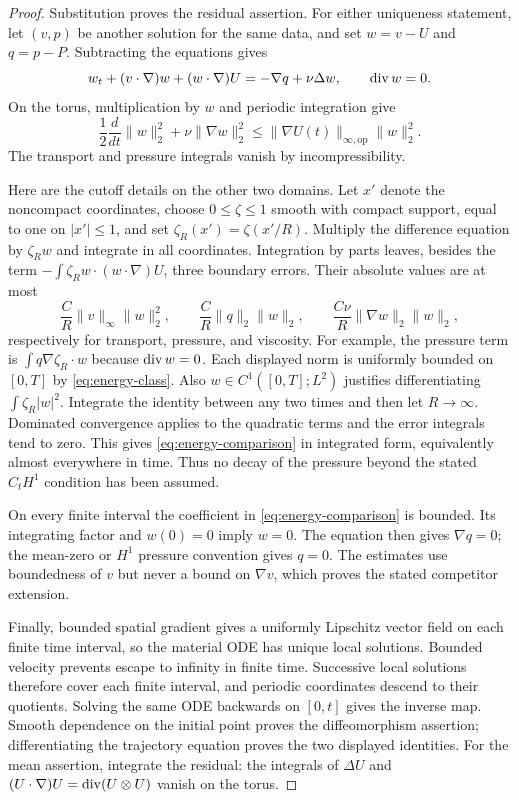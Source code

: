 \begin{proof}
Substitution proves the residual assertion. For either uniqueness
statement, let $(v,p)$ be another solution for the same data, and set
$w=v-U$ and $q=p-P$. Subtracting the equations gives
\[
 w_t+(v\cdot\nabla)w+(w\cdot\nabla)U
   =-\nabla q+\nu\Delta w,\qquad \operatorname{div} w=0.
\]
On the torus, multiplication by $w$ and periodic integration give
\begin{equation}\label{eq:energy-comparison}
 \frac12\frac{d}{dt}\|w\|_2^2+\nu\|\nabla w\|_2^2
 \leq\|\nabla U(t)\|_{\infty,\mathrm{op}}\|w\|_2^2.
\end{equation}
The transport and pressure integrals vanish by incompressibility.

Here are the cutoff details on the other two domains. Let $x'$ denote
the noncompact coordinates, choose $0\leq\zeta\leq1$ smooth with
compact support, equal to one on $|x'|\leq1$, and set
$\zeta_R(x')=\zeta(x'/R)$. Multiply the difference equation by
$\zeta_Rw$ and integrate in all coordinates. Integration by parts
leaves, besides the term $-\int\zeta_Rw\cdot(w\cdot\nabla)U$,
three boundary errors. Their absolute values are at most
\[
 \frac C R\|v\|_\infty\|w\|_2^2,\qquad
 \frac C R\|q\|_2\|w\|_2,\qquad
 \frac {C\nu}R\|\nabla w\|_2\|w\|_2,
\]
respectively for transport, pressure, and viscosity. For example,
the pressure term is $\int q\nabla\zeta_R\cdot w$ because
$\operatorname{div} w=0$. Each displayed norm is uniformly bounded on $[0,T]$
by \eqref{eq:energy-class}. Also $w\in C^1([0,T];L^2)$
justifies differentiating $\int\zeta_R|w|^2$. Integrate the identity
between any two times and then let $R\to\infty$. Dominated
convergence applies to the quadratic terms and the error integrals
tend to zero. This gives \eqref{eq:energy-comparison} in integrated
form, equivalently almost everywhere in time. Thus no decay of the
pressure beyond the stated $C_tH^1$ condition has been assumed.

On every finite interval the coefficient in
\eqref{eq:energy-comparison} is bounded. Its integrating factor and
$w(0)=0$ imply $w=0$. The equation then gives $\nabla q=0$;
the mean-zero or $H^1$ pressure convention gives $q=0$.
The estimates use boundedness of $v$ but never a bound on $\nabla v$,
which proves the stated competitor extension.

Finally, bounded spatial gradient gives a uniformly Lipschitz vector
field on each finite time interval, so the material ODE has unique
local solutions. Bounded velocity prevents escape to infinity in
finite time. Successive local solutions therefore cover each finite
interval, and periodic coordinates descend to their quotients.
Solving the same ODE backwards on $[0,t]$ gives the inverse map.
Smooth dependence on the initial point proves the diffeomorphism
assertion; differentiating the trajectory equation proves the two
displayed identities.
For the mean assertion, integrate the residual: the integrals of
$\Delta U$ and $(U\cdot\nabla)U=\operatorname{div}(U\otimes U)$ vanish on
the torus.
\end{proof}


